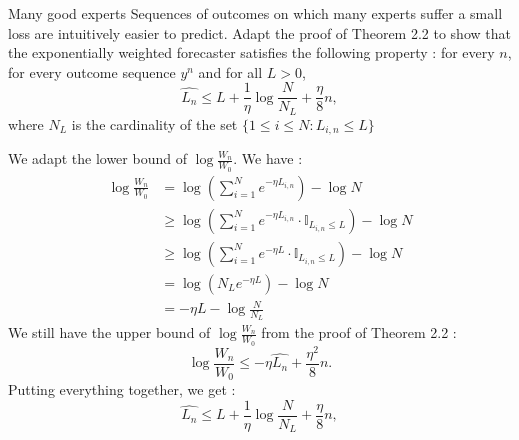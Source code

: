 \begin{exercise}[]{Many good experts}
	Sequences of outcomes on which many experts suffer a small loss are intuitively easier to predict. Adapt the proof of Theorem 2.2 to show that the exponentially weighted forecaster satisfies the following property : for every $ n $, for every outcome sequence $ y^{n} $ and for all $ L >0 $,
\begin{equation*}
	\widehat{L_n} \leq L + \frac{1}{\eta}\log \frac{N}{N_L} + \frac{\eta}{8}n,
\end{equation*}
where $ N_L $ is the cardinality of the set $ \{ 1 \leq i \leq N : L_{i,n} \leq L \} $
\end{exercise}

\begin{solution}[]
	We adapt the lower bound of $ \log \frac{W_n}{W_0} $. We have :
\begin{align*}
	\log \frac{W_n}{W_0} &= \log \left( \sum_{i=1}^{N}e^{-\eta L_{i,n}} \right) - \log N \\
			     &\geq \log \left( \sum_{i=1}^{N}e^{-\eta L_{i,n}}\cdot \mathbb{I}_{L_{i,n}\leq L} \right) - \log N \\
			     &\geq \log \left( \sum_{i=1}^{N}e^{-\eta L}\cdot \mathbb{I}_{L_{i,n}\leq L} \right) - \log N \\
			     &=\log \left( N_L e^{-\eta L} \right) - \log N \\
			     &= - \eta L - \log \frac{N}{N_L}
\end{align*}
We still have the upper bound of $ \log \frac{W_n}{W_0} $ from the proof of Theorem 2.2 :
\begin{equation*}
	\log \frac{W_n}{W_0} \leq -\eta \widehat{L_n} + \frac{\eta^2}{8}n.
\end{equation*}
Putting everything together, we get :
\begin{equation*}
	\widehat{L_n} \leq L + \frac{1}{\eta}\log \frac{N}{N_L} + \frac{\eta}{8}n,
\end{equation*}


\end{solution}
